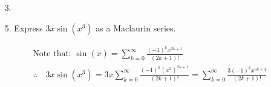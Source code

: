 \begin{itemize}
        \item [3.] 

        \item [5.] Express $3x\sin(x^{3})$ as a Maclaurin series.
        \\
        \begin{mdframed}
            \begin{equation*}
                \begin{gathered}
                    \text{Note that: } \sin(x) = 
                    \sum_{k=0}^{\infty}\frac{(-1)^{k}x^{2k+1}}{(2k+1)!}    \\
                    \therefore \quad 3x\sin(x^{3}) = 
                    3x\sum_{k=0}^{\infty}\frac{(-1)^{k}(x^{3})^{2k+1}}{(2k+1)!} =
                    \boxed{\sum_{k=0}^{\infty}\frac{3(-1)^{k}x^{6k+4}}{(2k+1)!}}
                \end{gathered}
            \end{equation*}            
        \end{mdframed}
    \end{itemize}

